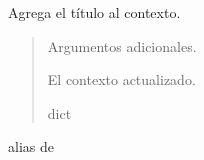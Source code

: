 \documentclass[letterpaper,10pt,spanish]{sphinxmanual}
\begin{document}
\begin{fulllineitems}
\begin{fulllineitems}

\pysigstartsignatures
{}
\pysigstopsignatures
\sphinxAtStartPar
Agrega el título al contexto.
\begin{quote}\begin{description}
\sphinxAtStartPar
{} \textendash{} Argumentos adicionales.

\sphinxAtStartPar
El contexto actualizado.

\sphinxAtStartPar
dict

\end{description}\end{quote}

\end{fulllineitems}



\begin{fulllineitems}

\pysigstartsignatures
{}
\pysigstopsignatures
\sphinxAtStartPar
alias de 

\end{fulllineitems}



\begin{fulllineitems}

\pysigstartsignatures
{}
\pysigstopsignatures
\end{fulllineitems}



\begin{fulllineitems}

\pysigstartsignatures
{}
\pysigstopsignatures
\end{fulllineitems}


\end{fulllineitems}
\end{document}
